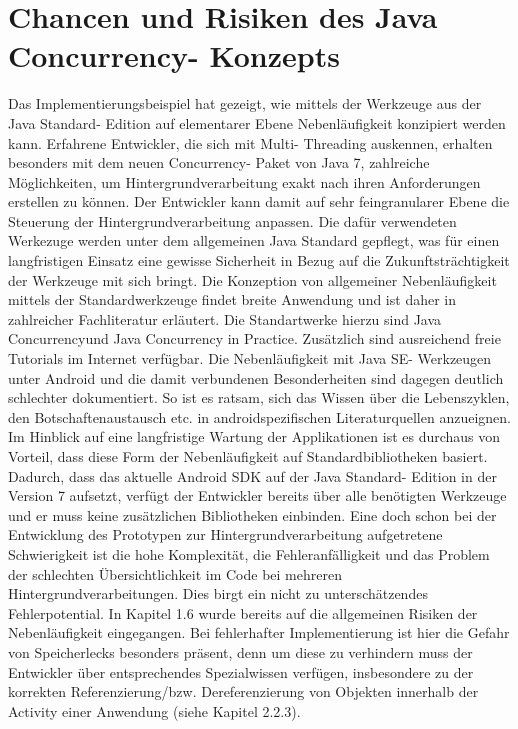 \documentclass[12pt,oneside,a4paper,bibtotoc,liststotoc]{scrreprt}
\begin{document}
\section{Chancen und Risiken des Java Concurrency- Konzepts}
Das Implementierungsbeispiel hat gezeigt, wie mittels der Werkzeuge aus der Java Standard- Edition auf elementarer Ebene Nebenläufigkeit konzipiert werden kann. Erfahrene Entwickler, die sich mit Multi- Threading auskennen, erhalten besonders mit dem neuen Concurrency- Paket von Java 7, zahlreiche Möglichkeiten, um Hintergrundverarbeitung exakt nach ihren Anforderungen erstellen zu können. Der Entwickler kann damit auf sehr feingranularer Ebene die Steuerung der Hintergrundverarbeitung anpassen. Die dafür verwendeten Werkezuge werden unter dem allgemeinen Java Standard gepflegt, was für einen langfristigen Einsatz eine gewisse Sicherheit in Bezug auf die Zukunftsträchtigkeit der Werkzeuge mit sich bringt. Die Konzeption von allgemeiner Nebenläufigkeit mittels der Standardwerkzeuge findet breite Anwendung und ist daher in zahlreicher Fachliteratur erläutert. Die Standartwerke hierzu sind \glqq Java Concurrency\grqq und \glqq Java Concurrency in Practice\grqq.  Zusätzlich sind ausreichend freie Tutorials im Internet verfügbar. Die Nebenläufigkeit mit Java SE- Werkzeugen unter Android und die damit verbundenen Besonderheiten sind dagegen deutlich schlechter dokumentiert. So ist es ratsam, sich das Wissen über die Lebenszyklen, den Botschaftenaustausch etc. in androidspezifischen Literaturquellen anzueignen.
Im Hinblick auf eine langfristige Wartung der Applikationen ist es durchaus von Vorteil, dass diese Form der Nebenläufigkeit auf Standardbibliotheken basiert. Dadurch, dass das aktuelle Android SDK auf der Java Standard- Edition in der Version 7 aufsetzt, verfügt der Entwickler bereits über alle benötigten Werkzeuge und er muss keine zusätzlichen Bibliotheken einbinden.
Eine doch schon bei der Entwicklung des Prototypen zur Hintergrundverarbeitung aufgetretene Schwierigkeit ist die hohe Komplexität, die Fehleranfälligkeit und das Problem der schlechten Übersichtlichkeit im Code bei mehreren Hintergrundverarbeitungen. Dies birgt ein nicht zu unterschätzendes Fehlerpotential. In Kapitel 1.6 wurde bereits auf die allgemeinen Risiken der Nebenläufigkeit eingegangen. Bei fehlerhafter Implementierung ist hier die Gefahr von Speicherlecks besonders präsent, denn um diese zu verhindern muss der Entwickler über entsprechendes Spezialwissen verfügen, insbesondere zu der korrekten Referenzierung/bzw. Dereferenzierung von Objekten innerhalb der Activity einer Anwendung (siehe Kapitel 2.2.3).
\end{document}
